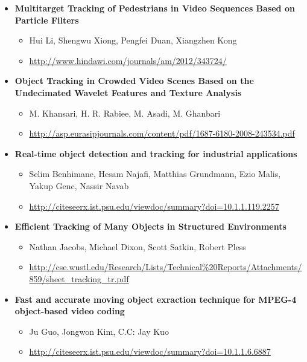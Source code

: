 \documentclass[times, utf8, seminar, numeric]{fer}
\begin{document}
\begin{itemize}

\item \textbf{Multitarget Tracking of Pedestrians in Video Sequences Based on Particle Filters}
\begin{itemize}
\item Hui Li, Shengwu Xiong, Pengfei Duan, Xiangzhen Kong
\item \url{http://www.hindawi.com/journals/am/2012/343724/}
\end{itemize}

\item \textbf{Object Tracking in Crowded Video Scenes Based on the Undecimated Wavelet Features and Texture Analysis}
\begin{itemize}
\item M. Khansari, H. R. Rabiee, M. Asadi, M. Ghanbari
\item \url{http://asp.eurasipjournals.com/content/pdf/1687-6180-2008-243534.pdf}
\end{itemize}

\item \textbf{Real-time object detection and tracking for industrial applications}
\begin{itemize}
\item  Selim Benhimane, Hesam Najafi, Matthias Grundmann, Ezio Malis, Yakup Genc, Nassir Navab
\item \url{http://citeseerx.ist.psu.edu/viewdoc/summary?doi=10.1.1.119.2257}
\end{itemize}


\item \textbf{Efficient Tracking of Many Objects in Structured Environments}
\begin{itemize}
\item Nathan Jacobs, Michael Dixon, Scott Satkin, Robert Pless
\item \url{http://cse.wustl.edu/Research/Lists/Technical%20Reports/Attachments/859/sheet_tracking_tr.pdf}
\end{itemize}

\item \textbf{Fast and accurate moving object exraction technique for MPEG-4 object-based video coding}
\begin{itemize}
\item Ju Guo, Jongwon Kim, C.C: Jay Kuo
\item \url{http://citeseerx.ist.psu.edu/viewdoc/summary?doi=10.1.1.6.6887}
\end{itemize}

\end{itemize}
\end{document}
